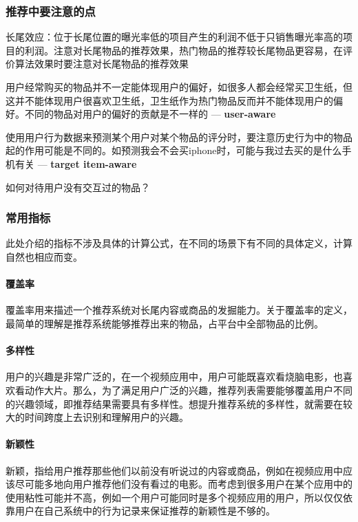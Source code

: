 \subsubsection{推荐中要注意的点}
\begin{myitemize}
	\item 长尾效应：位于长尾位置的曝光率低的项目产生的利润不低于只销售曝光率高的项目的利润。注意对长尾物品的推荐效果，热门物品的推荐较长尾物品更容易，在评价算法效果时要注意对长尾物品的推荐效果
	\item 用户经常购买的物品并不一定能体现用户的偏好，如很多人都会经常买卫生纸，但这并不能体现用户很喜欢卫生纸，卫生纸作为热门物品反而并不能体现用户的偏好。不同的物品对用户的偏好的贡献是不一样的 --- \textbf{user-aware}
	\item 使用用户行为数据来预测某个用户对某个物品的评分时，要注意历史行为中的物品起的作用可能是不同的\cite{he2018nais}。如预测我会不会买iphone时，可能与我过去买的是什么手机有关 --- \textbf{target item-aware}
	\item 如何对待用户没有交互过的物品？
\end{myitemize}

\subsubsection{常用指标}
此处介绍的指标不涉及具体的计算公式，在不同的场景下有不同的具体定义，计算自然也相应而变。
\paragraph{覆盖率}覆盖率用来描述一个推荐系统对长尾内容或商品的发掘能力。关于覆盖率的定义，最简单的理解是推荐系统能够推荐出来的物品，占平台中全部物品的比例。

\paragraph{多样性}用户的兴趣是非常广泛的，在一个视频应用中，用户可能既喜欢看烧脑电影，也喜欢看动作大片。那么，为了满足用户广泛的兴趣，推荐列表需要能够覆盖用户不同的兴趣领域，即推荐结果需要具有多样性。想提升推荐系统的多样性，就需要在较大的时间跨度上去识别和理解用户的兴趣。

\paragraph{新颖性}新颖，指给用户推荐那些他们以前没有听说过的内容或商品，例如在视频应用中应该尽可能多地向用户推荐他们没有看过的电影。而考虑到很多用户在某个应用中的使用粘性可能并不高，例如一个用户可能同时是多个视频应用的用户，所以仅仅依靠用户在自己系统中的行为记录来保证推荐的新颖性是不够的。


